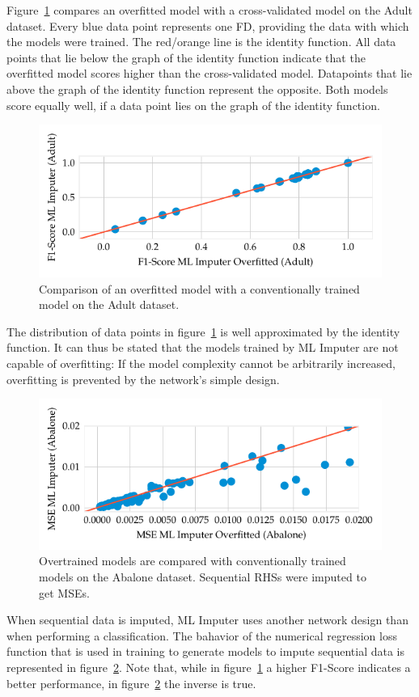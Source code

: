 Figure~\ref{fig:f1-ml-overfit-adult} compares an overfitted model with a cross-validated model on the Adult dataset.
Every blue data point represents one FD, providing the data with which the models were trained.
The red/orange line is the identity function.
All data points that lie below the graph of the identity function indicate that the overfitted model scores higher than the cross-validated model.
Datapoints that lie above the graph of the identity function represent the opposite.
Both models score equally well, if a data point lies on the graph of the identity function.
\begin{figure}[ht]
     \centering
     \includegraphics[width=\textwidth]{../figures/adult/f1_ml_overfit.pdf}
     \caption{Comparison of an overfitted model with a conventionally trained model on the Adult dataset.}
     \label{fig:f1-ml-overfit-adult}
\end{figure}
The distribution of data points in figure~\ref{fig:f1-ml-overfit-adult} is well approximated by the identity function.
It can thus be stated that the models trained by ML Imputer are not capable of overfitting:
If the model complexity cannot be arbitrarily increased, overfitting is prevented by the network's simple design.\cite[ch.~6,~p.~51-52]{DUD00}
\begin{figure}[ht]
     \centering
     \includegraphics[width=\textwidth]{../figures/abalone/mse_ml_overfit.pdf}
     \caption{Overtrained models are compared with conventionally trained models on the Abalone dataset. Sequential RHSs were imputed to get MSEs.}
     \label{fig:mse-ml-overfit-abalone}
\end{figure}
When sequential data is imputed, ML Imputer uses another network design than when performing a classification.\cite[p.~2025]{BIE18}
The bahavior of the numerical regression loss function that is used in training to generate models to impute sequential data is represented in figure~\ref{fig:mse-ml-overfit-abalone}.
Note that, while in figure~\ref{fig:f1-ml-overfit-adult} a higher F1-Score indicates a better performance, in figure~\ref{fig:mse-ml-overfit-abalone} the inverse is true.

